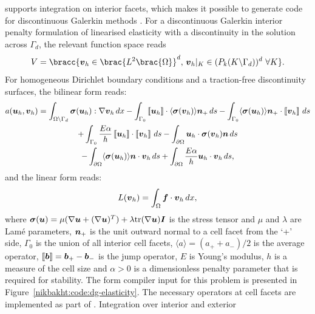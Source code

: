 \ffc{} supports integration on interior facets, which makes it possible
to generate code for discontinuous Galerkin methods \citep{OelgaardLoggWells2008a}.
For a discontinuous Galerkin interior penalty formulation of linearised
elasticity with a discontinuity in the solution across $\Gamma_{d}$,
the relevant function space reads
%
\begin{equation}
 V = \bracc{\vect{v}_{h} \in \brac{L^{2}\brac{\Omega}}^{d}, \,
            \vect{v}_{h}|_K \in (P_{k}(K\backslash\Gamma_{d}))^{d} \ \forall K}.
\end{equation}
%
For homogeneous Dirichlet boundary conditions and a traction-free
discontinuity surfaces, the bilinear form reads:
%
\begin{multline}
 a(\boldsymbol{u}_{h}, \boldsymbol{v}_{h}) = \int_{\Omega \backslash \Gamma_{d}} \boldsymbol{\sigma}(\boldsymbol{u}_{h})
                                :  \nabla \boldsymbol{v}_{h} \, d x
 -  \int_{\Gamma_0} \left\llbracket {\boldsymbol{u}_{h}} \right\rrbracket \cdot \langle \boldsymbol{\sigma}(\boldsymbol{v}_{h}) \rangle \boldsymbol{n}_{+} \, d s
 - \int_{\Gamma_{0}} \langle \boldsymbol{\sigma}(\boldsymbol{u}_{h}) \rangle \boldsymbol{n}_{+} \cdot \left\llbracket {\boldsymbol{v}_{h}} \right\rrbracket  \, d s
\\
 + \int_{\Gamma_0} \frac{E \alpha}{h}  \left\llbracket {\boldsymbol{u}_{h}} \right\rrbracket \cdot \left\llbracket {\boldsymbol{v}_{h}} \right\rrbracket \, d s
 -  \int_{\partial \Omega} \boldsymbol{u}_{h} \cdot \boldsymbol{\sigma}(\boldsymbol{v}_{h})\boldsymbol{n} \, d s
\\
 - \int_{\partial \Omega} \langle \boldsymbol{\sigma}(\boldsymbol{u}_{h}) \rangle \boldsymbol{n} \cdot \boldsymbol{v}_{h}  \, d s
 + \int_{\partial \Omega} \frac{E \alpha}{h}  \boldsymbol{u}_{h} \cdot \boldsymbol{v}_{h} \, d s,
\end{multline}
%
and the linear form reads:
%
\begin{equation}
 L(\boldsymbol{v}_{h}) = \int_{\Omega} \boldsymbol{f} \cdot \boldsymbol{v}_{h} \, d x,
\end{equation}
%
where
$\boldsymbol{\sigma}(\boldsymbol{u})
= \mu(\nabla\boldsymbol{u} + (\nabla \boldsymbol{u})^{T} )
+ \lambda {\rm tr}(\nabla \boldsymbol{u}) \boldsymbol{I}$
is the stress tensor and $\mu$ and $\lambda$ are Lam\'e parameters,
$\boldsymbol{n}_{+}$ is the unit outward normal to a cell facet from the `+' side,
$\Gamma_0$ is the union of all interior cell facets,
$\langle a \rangle = (a_{+} + a_{-})/2$ is the  average operator,
$\left\llbracket {\boldsymbol{b}} \right\rrbracket = \boldsymbol{b}_{+} - \boldsymbol{b}_{-}$ is the jump operator,
$E$ is Young's modulus, $h$ is a measure of the cell size
and $\alpha > 0$ is a dimensionless penalty parameter that
is required for stability.
The form compiler input for this problem is presented in
Figure~\ref{nikbakht:code:dg-elasticity}. The necessary operators at cell facets
are implemented as part of \ufl{}. Integration over interior and exterior
